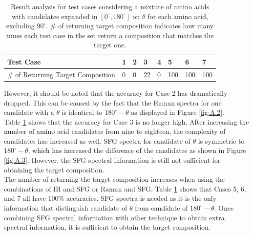 \begin{table}[ht!]
\begin{center}
{\def\arraystretch{1.5}
\begin{tabular}{| l | l | l | l | l | l | l | l |}
\hline
Test Case & 1 & 2 & 3 & 4 & 5 & 6 & 7 \\ \hline
\# of Returning Target Composition& 0 & 0 & 22 & 0 & 100 & 100 & 100 \\ \hline
\end{tabular} 
}
\end{center}
\caption{Result analysis for test cases considering a mixture of amino acids with candidates expanded in $[0^{\circ}, 180^{\circ}]$ on $\theta$ for each amino acid, excluding $90^{\circ}$. \# of returning target composition indicates how many times each test case in the set return a composition that matches the target one.}
\label{tab:5.3}
\end{table}	

However, it should be noted that the accuracy for Case 2 has dramatically dropped. This can be caused by the fact that the Raman spectra for one candidate with a $\theta$ is identical to $180^{\circ}-\theta$ as displayed in Figure \ref{fig:A.2}. \\

Table \ref{tab:5.3} shows that the accuracy for Case 3 is no longer high. After increasing the number of amino acid candidates from nine to eighteen, the complexity of candidates has increased as well. SFG spectra for candidate of $\theta$ is symmetric to $180^{\circ}-\theta$, which has increased the difference of the candidates as shown in Figure \ref{fig:A.3}. However, the SFG spectral information is still not sufficient for obtaining the target composition. \\

The number of returning the target composition increases when using the combinations of IR and SFG or Raman and SFG. Table \ref{tab:5.3} shows that Cases 5, 6, and 7 all have 100\% accuracies. SFG spectra is needed as it is the only information that distinguish candidate of $\theta$ from candidate of $180^{\circ}-\theta$. Once combining SFG spectral information with other technique to obtain extra spectral information, it is sufficient to obtain the target composition. \\

